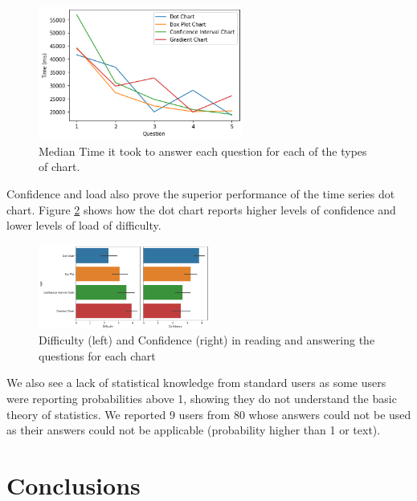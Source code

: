 \documentclass[a4paper,3p,sort&compress]{elsarticle}
\begin{document}
\begin{figure}
  \centering
   \includegraphics[width=0.6\textwidth]{duration_evo}
  \caption{\label{figure:duration} Median Time it took to answer each question for each of the types of chart.}
\end{figure}  

Confidence and load also prove the superior performance of the time series dot chart. 
Figure \ref{figure:confi_load} shows how the dot chart reports higher levels of confidence and 
lower levels of load of difficulty.

\begin{figure}
  \centering
   \includegraphics[width=0.5\textwidth]{confi_load}
  \caption{\label{figure:confi_load} Difficulty (left) and Confidence (right) in reading and answering the questions for each chart}
\end{figure}

We also see a lack of statistical knowledge from standard users as some users were reporting 
probabilities above 1, showing they do not understand the basic theory of statistics. 
We reported 9 users from 80 whose answers could not be used as their answers could not be 
applicable (probability higher than 1 or text).

\section{Conclusions}
\label{sec:concl}


\end{document}
